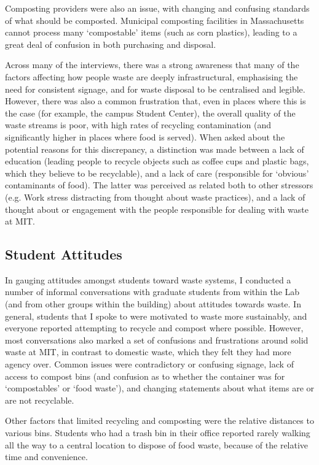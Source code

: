 \documentclass[nofonts,nols,justified,nobib]{tufte-book}
\begin{document}
Composting providers were also an issue, with changing and confusing standards of what should be composted. Municipal composting facilities in Massachusetts cannot process many `compostable' items (such as corn plastics), leading to a great deal of confusion in both purchasing and disposal. 

Across many of the interviews, there was a strong awareness that many of the factors affecting how people waste are deeply infrastructural, emphasising the need for consistent signage, and for waste disposal to be centralised and legible. However, there was also a common frustration that, even in places where this is the case (for example, the campus Student Center), the overall quality of the waste streams is poor, with high rates of recycling contamination (and significantly higher in places where food is served). When asked about the potential reasons for this discrepancy, a distinction was made between a lack of education (leading people to recycle objects such as coffee cups and plastic bags, which they believe to be recyclable), and a lack of care (responsible for `obvious' contaminants of food). The latter was perceived as related both to other stressors (e.g. Work stress distracting from thought about waste practices), and a lack of thought about or engagement with the people responsible for dealing with waste at MIT.

\subsection*{Student Attitudes}

In gauging attitudes amongst students toward waste systems, I conducted a number of informal conversations with graduate students from within the Lab (and from other groups within the building) about attitudes towards waste. In general, students that I spoke to were motivated to waste more sustainably, and everyone reported attempting to recycle and compost where possible. However, most conversations also marked a set of confusions and frustrations around solid waste at MIT, in contrast to domestic waste, which they felt they had more agency over. Common issues were contradictory or confusing signage, lack of access to compost bins (and confusion as to whether the container was for `compostables' or `food waste'), and changing statements about what items are or are not recyclable.

Other factors that limited recycling and composting were the relative distances to various bins. Students who had a trash bin in their office reported rarely walking all the way to a central location to dispose of food waste, because of the relative time and convenience.
\end{document}
